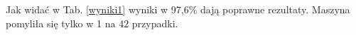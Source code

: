 \documentclass[12pt]{article}
\begin{document}
\noindent Jak widać w Tab. \ref{wyniki1} wyniki w 97,6\% dają poprawne rezultaty. Maszyna pomyliła się tylko w 1 na 42 przypadki. \newline
%
%
%
%
%
%
\end{document}

